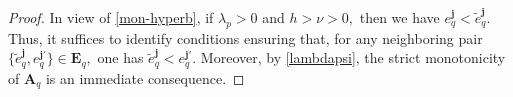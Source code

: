 \documentclass[10pt,reqno,final]{amsart}
\theoremstyle{remark}
\theoremstyle{definition}
\newcommand{\bs}[1]{\boldsymbol{#1}}
\begin{document}
\begin{proof}
In view of \eqref{mon-hyperb}, if $\lambda_p>0$ and $h>\nu>0,$ then we have 
$e_q^{\bs j}<\tilde e_q^{\bs j}.$ Thus, it suffices to identify conditions ensuring that, for any neighboring pair  $\{\tilde e_q^{\bs j}, e_q^{\bs j'}\}\in \bs E_q,$ one has 
$\tilde e_q^{\bs j}<e_q^{\bs j'}.$ Moreover, by \eqref{lambdapsi}, the strict monotonicity of $\bs A_q$ is an immediate consequence.  



\end{proof}
\end{document}
